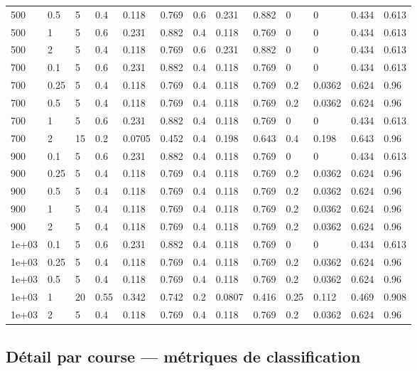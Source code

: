 \documentclass[11pt,a4paper]{article}
\begin{document}
\begin{longtable}{*{13}{l}}
    500 & 0.5 & 5 & 0.4 & 0.118 & 0.769 & 0.6 & 0.231 & 0.882 & 0 & 0 & 0.434 & 0.613 \\
    500 & 1 & 5 & 0.6 & 0.231 & 0.882 & 0.4 & 0.118 & 0.769 & 0 & 0 & 0.434 & 0.613 \\
    500 & 2 & 5 & 0.4 & 0.118 & 0.769 & 0.6 & 0.231 & 0.882 & 0 & 0 & 0.434 & 0.613 \\
    700 & 0.1 & 5 & 0.6 & 0.231 & 0.882 & 0.4 & 0.118 & 0.769 & 0 & 0 & 0.434 & 0.613 \\
    700 & 0.25 & 5 & 0.4 & 0.118 & 0.769 & 0.4 & 0.118 & 0.769 & 0.2 & 0.0362 & 0.624 & 0.96 \\
    700 & 0.5 & 5 & 0.4 & 0.118 & 0.769 & 0.4 & 0.118 & 0.769 & 0.2 & 0.0362 & 0.624 & 0.96 \\
    700 & 1 & 5 & 0.6 & 0.231 & 0.882 & 0.4 & 0.118 & 0.769 & 0 & 0 & 0.434 & 0.613 \\
    700 & 2 & 15 & 0.2 & 0.0705 & 0.452 & 0.4 & 0.198 & 0.643 & 0.4 & 0.198 & 0.643 & 0.96 \\
    900 & 0.1 & 5 & 0.6 & 0.231 & 0.882 & 0.4 & 0.118 & 0.769 & 0 & 0 & 0.434 & 0.613 \\
    900 & 0.25 & 5 & 0.4 & 0.118 & 0.769 & 0.4 & 0.118 & 0.769 & 0.2 & 0.0362 & 0.624 & 0.96 \\
    900 & 0.5 & 5 & 0.4 & 0.118 & 0.769 & 0.4 & 0.118 & 0.769 & 0.2 & 0.0362 & 0.624 & 0.96 \\
    900 & 1 & 5 & 0.4 & 0.118 & 0.769 & 0.4 & 0.118 & 0.769 & 0.2 & 0.0362 & 0.624 & 0.96 \\
    900 & 2 & 5 & 0.4 & 0.118 & 0.769 & 0.4 & 0.118 & 0.769 & 0.2 & 0.0362 & 0.624 & 0.96 \\
    1e+03 & 0.1 & 5 & 0.6 & 0.231 & 0.882 & 0.4 & 0.118 & 0.769 & 0 & 0 & 0.434 & 0.613 \\
    1e+03 & 0.25 & 5 & 0.4 & 0.118 & 0.769 & 0.4 & 0.118 & 0.769 & 0.2 & 0.0362 & 0.624 & 0.96 \\
    1e+03 & 0.5 & 5 & 0.4 & 0.118 & 0.769 & 0.4 & 0.118 & 0.769 & 0.2 & 0.0362 & 0.624 & 0.96 \\
    1e+03 & 1 & 20 & 0.55 & 0.342 & 0.742 & 0.2 & 0.0807 & 0.416 & 0.25 & 0.112 & 0.469 & 0.908 \\
    1e+03 & 2 & 5 & 0.4 & 0.118 & 0.769 & 0.4 & 0.118 & 0.769 & 0.2 & 0.0362 & 0.624 & 0.96 \\
    \end{longtable}
\endgroup


\subsection{Détail par course --- métriques de classification}
\end{document}

